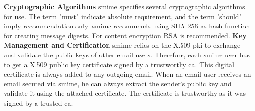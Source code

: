 \textbf{Cryptographic Algorithms}
\newline
\acrshort{smime} specifies several cryptographic algorithms for use. The term "must" indicate absolute requirement, and the term "should" imply recommendation only. \acrshort{smime} recommends using SHA-256 as hash function for creating message digests. For content encryption RSA is recommended.
\newline
\newline
\textbf{Key Management and Certification}
\newline
\acrshort{smime} relies on the X.509 \acrfull{pki} to exchange and validate the public keys of other \acrshort{email} users. Therefore, each \acrshort{smime} user has to get a X.509 public key certificate signed by a trustworthy \acrfull{ca}. This digital certificate is always added to any outgoing \acrshort{email}. When an \acrshort{email} user receives an \acrshort{email} secured via \acrshort{smime}, he can always extract the sender's public key and validate it using the attached certificate. The certificate is trustworthy as it was signed by a trusted \acrlong{ca}.